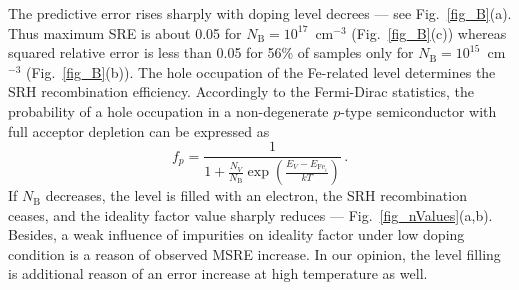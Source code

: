 \documentclass[a4paper,fleqn]{cas-sc}
\begin{document}
%

The predictive error rises sharply with doping level decrees --- see Fig.~\ref{fig_B}(a).
Thus maximum SRE is about 0.05 for $N_\mathrm{B}=10^{17}$~cm$^{-3}$ (Fig.~\ref{fig_B}(c))
whereas squared relative error is less than 0.05 for 56\% of samples only
for $N_\mathrm{B}=10^{15}$~cm$^{-3}$ (Fig.~\ref{fig_B}(b)).
The hole occupation of the Fe-related level determines the SRH recombination efficiency.
Accordingly to the Fermi-Dirac statistics, the probability of a hole
occupation in a non-degenerate $p$-type semiconductor with full acceptor depletion can be expressed as
\begin{equation}
\label{eqfp}
 f_p=\frac{1}{1+\frac{N_V}{N_\mathrm{B}}\exp\left(\frac{E_V-E_{\mathrm{Fe}_i}}{kT}\right)}\,.
\end{equation}
If $N_\mathrm{B}$ decreases, the level is filled with an electron,
the SRH recombination ceases, and the ideality factor value sharply reduces  --- Fig.~\ref{fig_nValues}(a,b).
Besides, a weak influence of impurities on ideality factor under low doping condition is a reason
of observed MSRE increase.
In our opinion, the level filling is additional reason of an error increase at high temperature as well.
\end{document}
